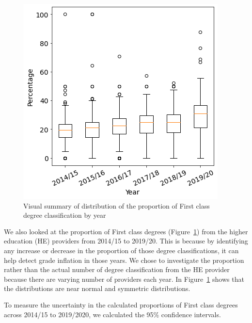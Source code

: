 \documentclass[11pt,a4paper]{article}
\begin{document}
\begin{figure}[t]
    \centering
    \includegraphics[scale=0.6]{figures/First_Prop_BoxPlt.png}
    \caption{Visual summary of distribution of the proportion of First class degree classification by year}
    \label{first-class-prop-boxplot}
\end{figure}


We also looked at the proportion of First class degrees (Figure~\ref{first-class-prop-boxplot}) from the higher education (HE) providers from 2014/15 to 2019/20. This is because by identifying any increase or decrease in the proportion of those degree classifications, it can help detect grade inflation in those years. We chose to investigate the proportion rather than the actual number of degree classification from the HE provider because there are varying number of providers each year. In Figure~\ref{first-class-prop-boxplot} shows that the distributions are near normal and symmetric distributions.



To measure the uncertainty in the calculated proportions of First class degrees across 2014/15 to 2019/2020, we calculated the 95\% confidence intervals. 
\end{document}

